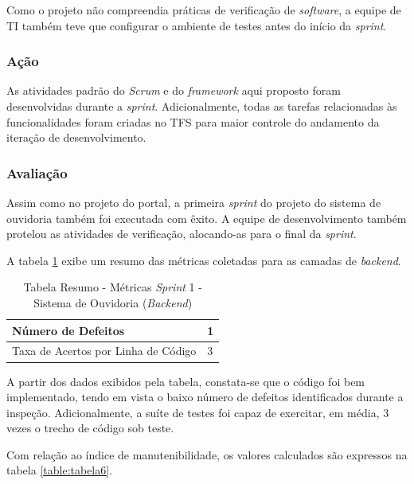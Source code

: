 Como o projeto não compreendia práticas de verificação de \textit{software}, a equipe de TI também teve que configurar o ambiente de testes antes do início da \textit{sprint}.

\subsubsection{Ação}

As atividades padrão do \textit{Scrum} e do \textit{framework} aqui proposto foram desenvolvidas durante a \textit{sprint}. Adicionalmente, todas as tarefas relacionadas às funcionalidades foram criadas no TFS para maior controle do andamento da iteração de desenvolvimento.

\subsubsection{Avaliação}

Assim como no projeto do portal, a primeira \textit{sprint} do projeto do sistema de ouvidoria também foi executada com êxito. A equipe de desenvolvimento também protelou as atividades de verificação, alocando-as para o final da \textit{sprint}.

A tabela \ref{table:tabela5} exibe um resumo das métricas coletadas para as camadas de \textit{backend}.

\begin{table}[h]
\caption{Tabela Resumo - Métricas \textit{Sprint} 1 - Sistema de Ouvidoria (\textit{Backend})}
\centering
\begin{tabular}{ | m{8cm} | m{8cm} | } 
\hline
Número de Defeitos & 1 \\ 
\hline
Taxa de Acertos por Linha de Código & 3 \\ 
\hline
\end{tabular}
\label{table:tabela5}
\end{table}

A partir dos dados exibidos pela tabela, constata-se que o código foi bem implementado, tendo em vista o baixo número de defeitos identificados durante a inspeção. Adicionalmente, a suíte de testes foi capaz de exercitar, em média, 3 vezes o trecho de código sob teste.

Com relação ao índice de manutenibilidade, os valores calculados são expressos na tabela \ref{table:tabela6}.

